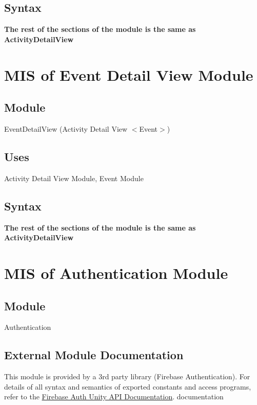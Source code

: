 \documentclass[12pt, titlepage]{article}
\begin{document}
\subsection{Syntax}
\textbf{The rest of the sections of the module is the same as ActivityDetailView}

\newpage

\section{MIS of Event Detail View Module} \label{mEDV}

\subsection{Module}

EventDetailView (Activity Detail View $<$Event$>$)
\subsection{Uses}

Activity Detail View Module, Event Module

\subsection{Syntax}
\textbf{The rest of the sections of the module is the same as ActivityDetailView}

\newpage

\section{MIS of Authentication Module} \label{mAuth}

\subsection{Module}

Authentication

\subsection{External Module Documentation}

This module is provided by a 3rd party library (Firebase Authentication). For details of all syntax and semantics of exported constants and access programs, refer to the \href{https://firebase.google.com/docs/reference/unity/namespace/firebase/auth}{Firebase Auth Unity API Documentation}.
documentation
\end{document}
